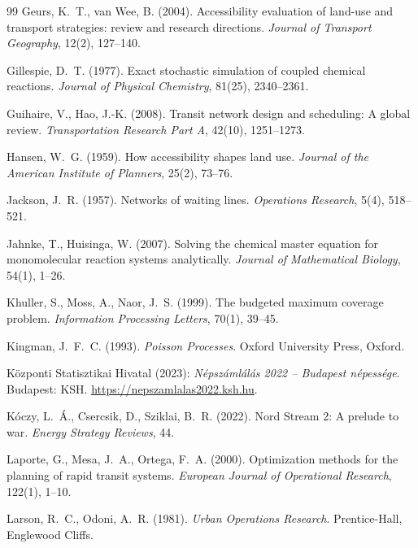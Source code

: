 \documentclass[12pt,a4paper]{article}
\theoremstyle{definition}
\theoremstyle{remark}
\begin{document}
\begin{thebibliography}{99}
Geurs, K.~T., van Wee, B. (2004). Accessibility evaluation of land-use and
transport strategies: review and research directions. \emph{Journal of
Transport Geography}, 12(2), 127--140.

Gillespie, D.~T. (1977). Exact stochastic simulation of coupled chemical
reactions. \emph{Journal of Physical Chemistry}, 81(25), 2340--2361.

Guihaire, V., Hao, J.-K. (2008). Transit network design and scheduling: A
global review. \emph{Transportation Research Part A}, 42(10), 1251--1273.

Hansen, W.~G. (1959). How accessibility shapes land use. \emph{Journal of the
American Institute of Planners}, 25(2), 73--76.

Jackson, J.~R. (1957). Networks of waiting lines. \emph{Operations Research},
5(4), 518--521.

Jahnke, T., Huisinga, W. (2007). Solving the chemical master equation for
monomolecular reaction systems analytically. \emph{Journal of Mathematical
Biology}, 54(1), 1--26.

Khuller, S., Moss, A., Naor, J.~S. (1999). The budgeted maximum coverage
problem. \emph{Information Processing Letters}, 70(1), 39--45.

Kingman, J.~F.~C. (1993). \emph{Poisson Processes}. Oxford University Press,
Oxford.

Központi Statisztikai Hivatal (2023): \emph{Népszámlálás 2022 -- Budapest
népessége}. Budapest: KSH. \url{https://nepszamlalas2022.ksh.hu}.

Kóczy, L.~Á., Csercsik, D., Sziklai, B.~R. (2022). Nord Stream 2: A prelude to
war. \emph{Energy Strategy Reviews}, 44.

Laporte, G., Mesa, J.~A., Ortega, F.~A. (2000). Optimization methods for the
planning of rapid transit systems. \emph{European Journal of Operational
Research}, 122(1), 1--10.

Larson, R.~C., Odoni, A.~R. (1981). \emph{Urban Operations Research}.
Prentice-Hall, Englewood Cliffs.


\end{thebibliography}
\end{document}
